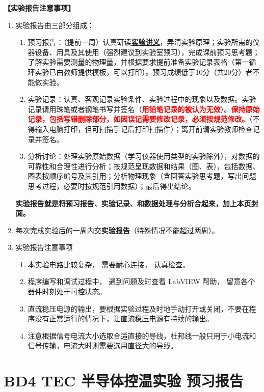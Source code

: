 \documentclass[dvipsnames, svgnames,a4paper,11pt]{article}
\begin{document}
\textbf{【实验报告注意事项】}
\begin{enumerate}
	\item 实验报告由三部分组成：
	\begin{enumerate}
		\item 预习报告：（提前一周）认真研读\underline{\textbf{实验讲义}}，弄清实验原理；实验所需的仪器设备、用具及其使用（强烈建议到实验室预习），完成课前预习思考题；了解实验需要测量的物理量，并根据要求提前准备实验记录表格（第一循环实验已由教师提供模板，可以打印）。预习成绩低于10分（共20分）者不能做实验。
	    \item 实验记录：认真、客观记录实验条件、实验过程中的现象以及数据。实验记录请用珠笔或者钢笔书写并签名（\textcolor{red}{\textbf{用铅笔记录的被认为无效}}）。\textcolor{red}{\textbf{保持原始记录，包括写错删除部分，如因误记需要修改记录，必须按规范修改。}}（不得输入电脑打印，但可扫描手记后打印扫描件）；离开前请实验教师检查记录并签名。
	    \item 分析讨论：处理实验原始数据（学习仪器使用类型的实验除外），对数据的可靠性和合理性进行分析；按规范呈现数据和结果（图、表），包括数据、图表按顺序编号及其引用；分析物理现象（含回答实验思考题，写出问题思考过程，必要时按规范引用数据）；最后得出结论。
	\end{enumerate}
	\textbf{实验报告就是将预习报告、实验记录、和数据处理与分析合起来，加上本页封面。}
	\item 每次完成实验后的一周内交\textbf{实验报告}（特殊情况不能超过两周）。
	\item 实验报告注意事项
		\begin{enumerate}[label=\roman*.]
			\item 本实验电路比较复杂， 需要耐心连接， 认真检查。
			\item 程序编写和调试过程中， 遇到问题及时查看 LabVIEW 帮助， 留意各个器件时刻处于可控状态。
			\item 直流稳压电源的输出，要根据实验过程及时地手动打开或关闭，不要在程序没有正常运行的情况下，让直流稳压电源有持续的输出。
			\item 注意根据信号电流大小选取合适直接的导线，杜邦线一般只用于小电流和信号传输，电流大时则需要选用直径大的导线。
		\end{enumerate}
\end{enumerate}


\clearpage
\tableofcontents
\clearpage

\setcounter{section}{0}
\section{BD4 \quad TEC 半导体控温实验 \quad\heiti 预习报告}
	
\end{document}
